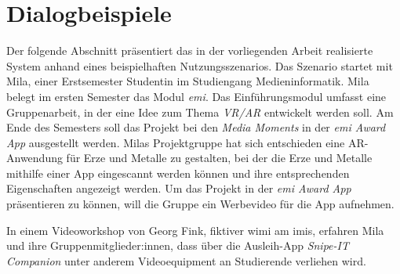\chapter{Dialogbeispiele}
\label{chapter-dialogbeispiel}
Der folgende Abschnitt präsentiert das in der vorliegenden Arbeit realisierte
System anhand eines beispielhaften Nutzungsszenarios. Das Szenario startet mit
Mila, einer Erstsemester Studentin im Studiengang Medieninformatik. Mila belegt
im ersten Semester das Modul \textit{\ac{emi}}. Das Einführungsmodul umfasst
eine Gruppenarbeit, in der eine Idee  zum Thema \textit{VR/AR} entwickelt werden
soll. Am Ende des Semesters soll das Projekt bei den \textit{Media Moments} in
der \textit{\ac{emi} Award App} ausgestellt werden.
Milas Projektgruppe hat sich entschieden eine AR-Anwendung für Erze und Metalle
zu gestalten, bei der die Erze und Metalle mithilfe einer App eingescannt werden
können und ihre entsprechenden Eigenschaften angezeigt werden. Um das Projekt in
der \textit{\ac{emi} Award App} präsentieren zu können, will die Gruppe ein
Werbevideo für die App aufnehmen.

In einem Videoworkshop von Georg Fink, fiktiver \ac{wimi} am \ac{imis}, erfahren
Mila und ihre Gruppenmitglieder:innen, dass über die Ausleih-App
\textit{Snipe-IT Companion} unter anderem Videoequipment an Studierende
verliehen wird.


